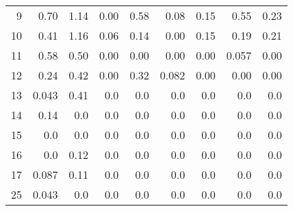 \begin{table}[ht]
\begin{tabular}{rrrrrrrrr}
  9 & 0.70  & 1.14  & 0.00  & 0.58  & 0.08  & 0.15  & 0.55  & 0.23  \\
 10 & 0.41  & 1.16  & 0.06  & 0.14  & 0.00 & 0.15  & 0.19  & 0.21  \\
 11 & 0.58  & 0.50  & 0.00  & 0.00 &  0.00 &  0.00 &  0.057  & 0.00 \\
 12 & 0.24  & 0.42  & 0.00  & 0.32  & 0.082  & 0.00 & 0.00 & 0.00 \\
 13 & 0.043 & 0.41  & 0.0  & 0.0  & 0.0  & 0.0  & 0.0  & 0.0  \\
 14 & 0.14 & 0.0  &  0.0  & 0.0  & 0.0  & 0.0  & 0.0  & 0.0  \\
 15 & 0.0  & 0.0  &  0.0  & 0.0  & 0.0  & 0.0  & 0.0  & 0.0  \\
 16 & 0.0 & 0.12 & 0.0  & 0.0  & 0.0  & 0.0  & 0.0  & 0.0  \\
 17 & 0.087 & 0.11 & 0.0  & 0.0  & 0.0  & 0.0  & 0.0  & 0.0  \\
 25 & 0.043 & 0.0 & 0.0  & 0.0  & 0.0  & 0.0  & 0.0  & 0.0  \\ 
   \hline
\end{tabular}
\end{table}


